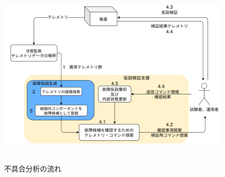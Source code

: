 \documentclass[11pt]{jsreport}
\begin{document}
\begin{figure}[H]
   \centering
      \includegraphics[height=9.0cm]{figure/fault_diagnosis_flow.png}
      \caption{不具合分析の流れ}
      \label{fig:fault_diagnosis}
\end{figure}
\end{document}
